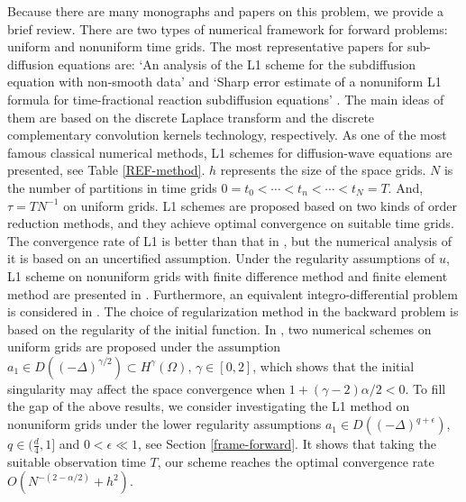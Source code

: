 \documentclass[11pt]{article}
\numberwithin{equation}{section}
\begin{document}
Because there are many monographs and papers on this problem, we provide a brief review. There are two types of numerical framework for forward problems: uniform \cite{Jin2016,Jin2016wave,Luo2019} and nonuniform \cite{Stynes2017,LiaoH2018L1,Kopteva2019} time grids. The most representative papers for sub-diffusion equations are: ‘An analysis of the L1 scheme for the subdiffusion equation with non-smooth data’ \cite{Jin2016} and ‘Sharp error estimate of a nonuniform L1 formula for time-fractional reaction subdiffusion equations’ \cite{LiaoH2018L1}. The main ideas of them are based on the discrete Laplace transform and the discrete complementary convolution kernels technology, respectively. As one of the most famous classical numerical methods, L1 schemes for diffusion-wave equations are presented, see Table \ref{REF-method}. $h$ represents the size of the space grids. $N$ is the number of partitions in time grids $0=t_0<\cdots<t_n<\cdots<t_N=T$. And, $\tau=T N^{-1}$ on uniform grids. L1 schemes \cite{Sun2006ANM,Shen2021,LyuP2022SFOR} are proposed based on two kinds of order reduction methods, and they achieve optimal convergence on suitable time grids. The convergence rate of L1 \cite{Shen2021} is better than that in \cite{LyuP2022SFOR,An2022}, but the numerical analysis of it is based on an uncertified assumption. Under the regularity assumptions of $u$, L1 scheme on nonuniform grids with finite difference method and finite element method are presented in \cite{LyuP2022SFOR,Xu2024}. Furthermore, an equivalent integro-differential problem is considered in \cite{Mustapha2013}.  The choice of regularization method in the backward problem is based on the regularity of the initial function. In \cite{Jin2016wave}, two numerical schemes on uniform grids are proposed under the assumption $a_1\in D((-\Delta)^{\gamma/2})\subset H^{\gamma}(\Omega)$, $\gamma\in[0,2]$, which shows that the initial singularity may affect the space convergence when $1+(\gamma-2)\alpha/2<0$. To fill the gap of the above results, we consider investigating the L1 method on nonuniform grids under the lower regularity assumptions $a_1\in D((-\Delta)^{q+\epsilon})$, $q\in(\frac{d}{4},1]$ and $0<\epsilon \ll 1$, see Section \ref{frame-forward}.  It shows that taking the suitable observation time $T$, our scheme reaches the optimal convergence rate $O(N^{-(2-\alpha/2)}+h^2)$.
\end{document}
